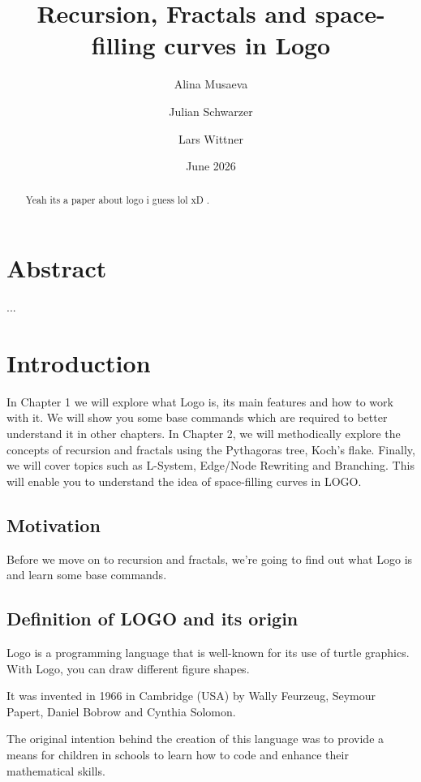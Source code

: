 \documentclass[a4paper, 11pt]{article}
\title{Recursion, Fractals and space-filling curves in Logo}
\author{Alina Musaeva \and Julian Schwarzer \and Lars Wittner}
\date{June 2026}
\begin{document}
\maketitle

\begin{abstract}
  Yeah its a paper about logo i guess lol xD \cite{hromkovic2010einfuhrung}.
\end{abstract}

\tableofcontents
\newpage

\section*{Abstract}

...

\section{Introduction}
In Chapter 1 we will explore what Logo is, its main features and how to work with it. We will show you some base commands which are required to better understand it in other chapters. In Chapter 2, we will methodically explore the concepts of recursion and fractals using the Pythagoras tree, Koch's flake. Finally, we will cover topics such as L-System, Edge/Node Rewriting and Branching. This will enable you to understand the idea of space-filling curves in LOGO.

\subsection{Motivation}
\label{sec:motivation}

Before we move on to recursion and fractals, we're going to find out what Logo is and learn some base commands.

\subsection{Definition of LOGO and its origin}
\label{sec:definitionlog}

Logo is a programming language that is well-known for its use of turtle graphics. With Logo, you can draw different figure shapes. 

It was invented in 1966 in Cambridge (USA) by Wally Feurzeug, Seymour Papert, Daniel Bobrow and Cynthia Solomon.

The original intention behind the creation of this language was to provide a means for children in schools to learn how to code and enhance their mathematical skills.
\end{document}
